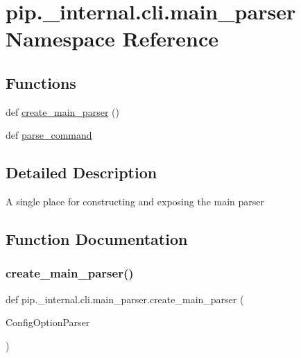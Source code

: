 \hypertarget{namespacepip_1_1__internal_1_1cli_1_1main__parser}{}\section{pip.\+\_\+internal.\+cli.\+main\+\_\+parser Namespace Reference}
\label{namespacepip_1_1__internal_1_1cli_1_1main__parser}
\subsection*{Functions}
\begin{DoxyCompactItemize}
\item 
def \hyperlink{namespacepip_1_1__internal_1_1cli_1_1main__parser_a013c5ce9f6e201f260c6fe1d61c66315}{create\+\_\+main\+\_\+parser} ()
\item 
def \hyperlink{namespacepip_1_1__internal_1_1cli_1_1main__parser_a3fce3296262e3d625a276d34513501ae}{parse\+\_\+command}
\end{DoxyCompactItemize}


\subsection{Detailed Description}
\begin{DoxyVerb}A single place for constructing and exposing the main parser
\end{DoxyVerb}
 

\subsection{Function Documentation}
\mbox{\label{namespacepip_1_1__internal_1_1cli_1_1main__parser_a013c5ce9f6e201f260c6fe1d61c66315}} 
\subsubsection{\texorpdfstring{create\+\_\+main\+\_\+parser()}{create\_main\_parser()}}
{\footnotesize\ttfamily def pip.\+\_\+internal.\+cli.\+main\+\_\+parser.\+create\+\_\+main\+\_\+parser (\begin{DoxyParamCaption}\item[{}]{Config\+Option\+Parser }\end{DoxyParamCaption})}

